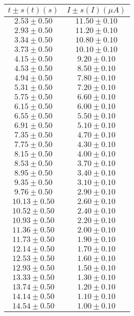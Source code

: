 \begin{table}[H]
\centering
\setlength{\arrayrulewidth}{1.2pt}
\begin{tabular}{|c|c|}
\hline
$t \pm s(t) (s)$ & $I \pm s(I) (\mu A)$ \\
\hline
$2.53 \pm 0.50$ & $11.50 \pm 0.10$ \\
$2.93 \pm 0.50$ & $11.20 \pm 0.10$ \\
$3.34 \pm 0.50$ & $10.80 \pm 0.10$ \\
$3.73 \pm 0.50$ & $10.10 \pm 0.10$ \\
$4.15 \pm 0.50$ & $9.20 \pm 0.10$ \\
$4.53 \pm 0.50$ & $8.50 \pm 0.10$ \\
$4.94 \pm 0.50$ & $7.80 \pm 0.10$ \\
$5.31 \pm 0.50$ & $7.20 \pm 0.10$ \\
$5.75 \pm 0.50$ & $6.60 \pm 0.10$ \\
$6.15 \pm 0.50$ & $6.00 \pm 0.10$ \\
$6.55 \pm 0.50$ & $5.50 \pm 0.10$ \\
$6.91 \pm 0.50$ & $5.10 \pm 0.10$ \\
$7.35 \pm 0.50$ & $4.70 \pm 0.10$ \\
$7.75 \pm 0.50$ & $4.30 \pm 0.10$ \\
$8.15 \pm 0.50$ & $4.00 \pm 0.10$ \\
$8.53 \pm 0.50$ & $3.70 \pm 0.10$ \\
$8.95 \pm 0.50$ & $3.40 \pm 0.10$ \\
$9.35 \pm 0.50$ & $3.10 \pm 0.10$ \\
$9.76 \pm 0.50$ & $2.90 \pm 0.10$ \\
$10.13 \pm 0.50$ & $2.60 \pm 0.10$ \\
$10.52 \pm 0.50$ & $2.40 \pm 0.10$ \\
$10.93 \pm 0.50$ & $2.20 \pm 0.10$ \\
$11.36 \pm 0.50$ & $2.00 \pm 0.10$ \\
$11.73 \pm 0.50$ & $1.90 \pm 0.10$ \\
$12.14 \pm 0.50$ & $1.70 \pm 0.10$ \\
$12.53 \pm 0.50$ & $1.60 \pm 0.10$ \\
$12.93 \pm 0.50$ & $1.50 \pm 0.10$ \\
$13.33 \pm 0.50$ & $1.30 \pm 0.10$ \\
$13.74 \pm 0.50$ & $1.20 \pm 0.10$ \\
$14.14 \pm 0.50$ & $1.10 \pm 0.10$ \\
$14.54 \pm 0.50$ & $1.00 \pm 0.10$ \\

\end{tabular}
\end{table}
